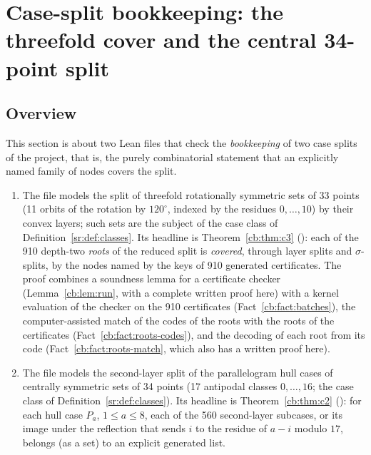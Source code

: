 \section{Case-split bookkeeping: the threefold cover and the central 34-point split}\label{cb:sec}

\subsection{Overview}\label{cb:sec:overview}

This section is about two Lean files that check the \emph{bookkeeping} of two case splits of the project, that is, the
purely combinatorial statement that an explicitly named family of nodes covers the split.

\begin{enumerate}[label=(\arabic*)]
\item The file  models the split of threefold rotationally symmetric sets of 33 points
  (11 orbits of the rotation by $120^\circ$, indexed by the residues $0,\dots,10$) by their convex layers; such sets
  are the subject of the case class  of Definition~\ref{sr:def:classes}. Its headline is
  Theorem~\ref{cb:thm:c3} (): each of the 910 depth-two \emph{roots} of the reduced
  split is \emph{covered}, through layer splits and $\sigma$-splits, by the nodes named by the keys of 910 generated
  certificates. The proof combines a soundness lemma for a certificate checker (Lemma~\ref{cb:lem:run}, with a
  complete written proof here) with a kernel evaluation of the checker on the 910 certificates
  (Fact~\ref{cb:fact:batches}), the computer-assisted match of the codes of the roots with the roots of the
  certificates (Fact~\ref{cb:fact:roots-codes}), and the decoding of each root from its code
  (Fact~\ref{cb:fact:roots-match}, which also has a written proof here).
\item The file  models the second-layer split of the parallelogram hull cases of
  centrally symmetric sets of 34 points (17 antipodal classes $0,\dots,16$; the case class  of
  Definition~\ref{sr:def:classes}). Its headline is Theorem~\ref{cb:thm:c2} (): for
  each hull case $P_a$, $1\le a\le 8$, each of the 560 second-layer subcases, or its image under the reflection that
  sends $i$ to the residue of $a-i$ modulo $17$, belongs (as a set) to an explicit generated list.
\end{enumerate}

